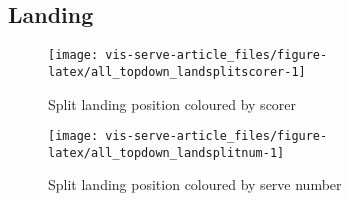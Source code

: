 \documentclass[article]{jss}
\begin{document}
\subsection{Landing}\label{landing}

\begin{CodeChunk}
\begin{figure}

{\centering \texttt{[image: vis-serve-article\_files/figure-latex/all\_topdown\_landsplitscorer-1]} 

}

\caption[Split landing position coloured by scorer]{Split landing position coloured by scorer}\label{fig:all_topdown_landsplitscorer}
\end{figure}
\end{CodeChunk}

\begin{CodeChunk}
\begin{figure}

{\centering \texttt{[image: vis-serve-article\_files/figure-latex/all\_topdown\_landsplitnum-1]} 

}

\caption[Split landing position coloured by serve number]{Split landing position coloured by serve number}\label{fig:all_topdown_landsplitnum}
\end{figure}
\end{CodeChunk}
\end{document}
